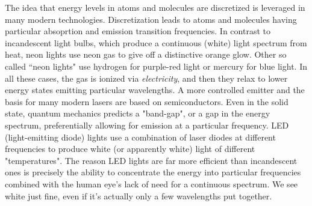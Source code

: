 The idea that energy levels in atoms and molecules are discretized is leveraged in many modern technologies. Discretization leads to atoms and molecules having particular absoprtion and emission transition frequencies. In contrast to incandescent light bulbs, which produce a continuous (white) light spectrum from heat, neon lights use neon gas to give off a distinctive orange glow. Other so called ``neon lights" use hydrogen for purple-red light or mercury for blue light. In all these cases, the gas is ionized via \textit{electricity}, and then they relax to lower energy states emitting particular wavelengths. A more controlled emitter and the basis for many modern lasers are based on semiconductors. Even in the solid state, quantum mechanics predicts a "band-gap", or a gap in the energy spectrum, preferentially allowing for emission at a particular frequency. LED (light-emitting diode) lights use a combination of laser diodes at different frequencies to produce white (or apparently white) light of different "temperatures". The reason LED lights are far more efficient than incandescent ones is precisely the ability to concentrate the energy into particular frequencies combined with the human eye's lack of need for a continuous spectrum. We see white just fine, even if it's actually only a few wavelengths put together. 

